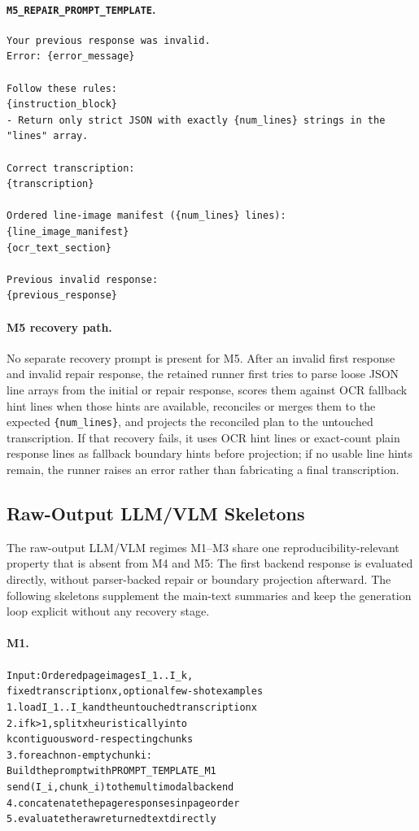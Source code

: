 \paragraph{\texttt{M5\_REPAIR\_PROMPT\_TEMPLATE}.}
\begin{lstlisting}[basicstyle=\scriptsize\ttfamily,breaklines=true,columns=fullflexible]
Your previous response was invalid.
Error: {error_message}

Follow these rules:
{instruction_block}
- Return only strict JSON with exactly {num_lines} strings in the "lines" array.

Correct transcription:
{transcription}

Ordered line-image manifest ({num_lines} lines):
{line_image_manifest}
{ocr_text_section}

Previous invalid response:
{previous_response}
\end{lstlisting}

\paragraph{M5 recovery path.}
No separate recovery prompt is present for M5. After an invalid first response and invalid repair response, the retained runner first tries to parse loose JSON line arrays from the initial or repair response, scores them against OCR fallback hint lines when those hints are available, reconciles or merges them to the expected \texttt{\{num\_lines\}}, and projects the reconciled plan to the untouched transcription. If that recovery fails, it uses OCR hint lines or exact-count plain response lines as fallback boundary hints before projection; if no usable line hints remain, the runner raises an error rather than fabricating a final transcription.

\subsection{Raw-Output LLM/VLM Skeletons}
\label{sec:appendix_prompt_only_pseudocode}

The raw-output LLM/VLM regimes M1--M3 share one reproducibility-relevant property that is absent from M4 and M5: The first backend response is evaluated directly, without parser-backed repair or boundary projection afterward. The following skeletons supplement the main-text summaries and keep the generation loop explicit without any recovery stage.

\paragraph{M1.}
{\footnotesize
\begin{alltt}
Input: Ordered page images I_1..I_k,
       fixed transcription x, optional few-shot examples
1. load I_1..I_k and the untouched transcription x
2. if k > 1, split x heuristically into
   k contiguous word-respecting chunks
3. for each non-empty chunk i:
     Build the prompt with PROMPT_TEMPLATE_M1
     send (I_i, chunk_i) to the multimodal backend
4. concatenate the page responses in page order
5. evaluate the raw returned text directly
\end{alltt}
}

